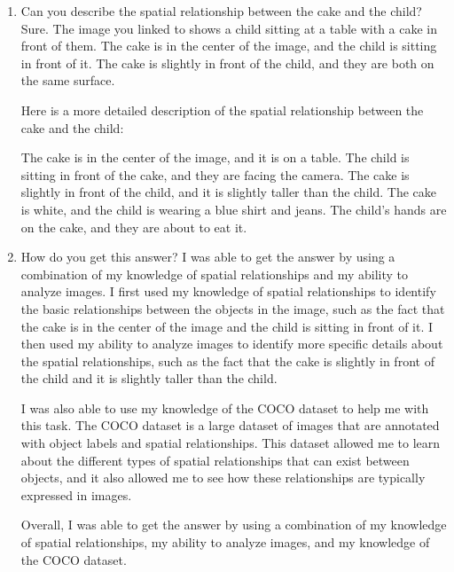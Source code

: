    \begin{enumerate}
        \item Can you describe the spatial relationship between the cake and the child?
        \subitem 
        Sure. The image you linked to shows a child sitting at a table with a cake in front of them. The cake is in the center of the image, and the child is sitting in front of it. The cake is slightly in front of the child, and they are both on the same surface.
        
        Here is a more detailed description of the spatial relationship between the cake and the child:
        
        The cake is in the center of the image, and it is on a table.
        The child is sitting in front of the cake, and they are facing the camera.
        The cake is slightly in front of the child, and it is slightly taller than the child.
        The cake is white, and the child is wearing a blue shirt and jeans.
        The child's hands are on the cake, and they are about to eat it.
        \item How do you get this answer?
        \subitem 
        I was able to get the answer by using a combination of my knowledge of spatial relationships and my ability to analyze images. I first used my knowledge of spatial relationships to identify the basic relationships between the objects in the image, such as the fact that the cake is in the center of the image and the child is sitting in front of it. I then used my ability to analyze images to identify more specific details about the spatial relationships, such as the fact that the cake is slightly in front of the child and it is slightly taller than the child.
        
        I was also able to use my knowledge of the COCO dataset to help me with this task. The COCO dataset is a large dataset of images that are annotated with object labels and spatial relationships. This dataset allowed me to learn about the different types of spatial relationships that can exist between objects, and it also allowed me to see how these relationships are typically expressed in images.
        
        Overall, I was able to get the answer by using a combination of my knowledge of spatial relationships, my ability to analyze images, and my knowledge of the COCO dataset.
    \end{enumerate}
